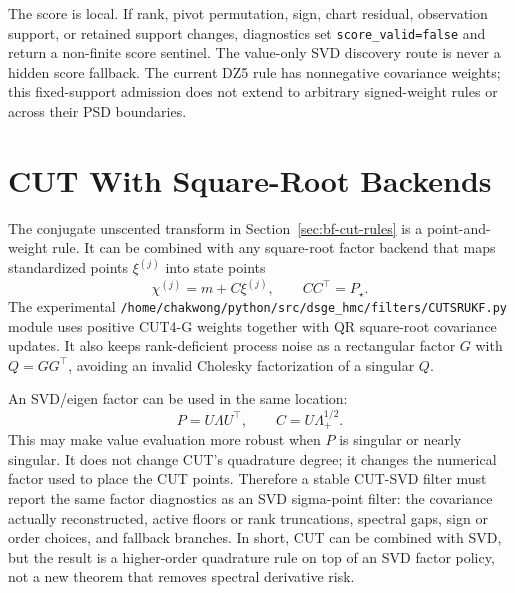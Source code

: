 The score is local.  If rank, pivot permutation, sign, chart residual,
observation support, or retained support changes, diagnostics set
\texttt{score\_valid=false} and return a non-finite score sentinel.  The
value-only SVD discovery route is never a hidden score fallback.  The current
DZ5 rule has nonnegative covariance weights; this fixed-support admission does
not extend to arbitrary signed-weight rules or across their PSD boundaries.

\section{CUT With Square-Root Backends}
\label{sec:bf-cut-square-root}

The conjugate unscented transform in Section~\ref{sec:bf-cut-rules} is a
point-and-weight rule.  It can be combined with any square-root factor backend
that maps standardized points $\xi^{(j)}$ into state points
\[
  \chi^{(j)}=m+C\xi^{(j)},\qquad CC^\top=P_\star .
\]
The experimental
\texttt{/home/chakwong/python/src/dsge\_hmc/filters/CUTSRUKF.py} module uses
positive CUT4-G weights together with QR square-root covariance updates.  It also
keeps rank-deficient process noise as a rectangular factor $G$ with
$Q=GG^\top$, avoiding an invalid Cholesky factorization of a singular $Q$.

An SVD/eigen factor can be used in the same location:
\[
  P=U\Lambda U^\top,\qquad C=U\Lambda_+^{1/2}.
\]
This may make value evaluation more robust when $P$ is singular or nearly
singular.  It does not change CUT's quadrature degree; it changes the numerical
factor used to place the CUT points.  Therefore a stable CUT-SVD filter must
report the same factor diagnostics as an SVD sigma-point filter: the covariance
actually reconstructed, active floors or rank truncations, spectral gaps, sign
or order choices, and fallback branches.  In short, CUT can be combined with
SVD, but the result is a higher-order quadrature rule on top of an SVD factor
policy, not a new theorem that removes spectral derivative risk.
